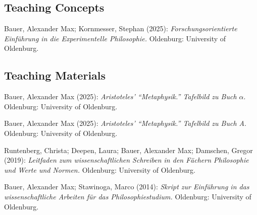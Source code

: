 \documentclass[a4paper,10pt]{article}
\newenvironment{literature}{%
   \parskip6pt\parindent0pt\raggedright
   \def\lititem{\hangindent=1cm\hangafter1}}{%
   \par\ignorespaces}
\begin{document}
\subsection*{Teaching Concepts}
\begin{literature}
\lititem Bauer, Alexander Max; Kornmesser, Stephan (2025): \textit{Forschungsorientierte Einführung in die Experimentelle Philosophie.} Oldenburg: University of Oldenburg.
\end{literature}


\subsection*{Teaching Materials}
\begin{literature}
\lititem Bauer, Alexander Max (2025): \textit{Aristoteles' \enquote{Metaphysik.} Tafelbild zu Buch $\alpha$}. Oldenburg: University of Oldenburg.

\lititem Bauer, Alexander Max (2025): \textit{Aristoteles' \enquote{Metaphysik.} Tafelbild zu Buch A}. Oldenburg: University of Oldenburg.

\lititem Runtenberg, Christa; Deepen, Laura; Bauer, Alexander Max; Damschen, Gregor (2019): \textit{Leitfaden zum wissenschaftlichen Schreiben in den Fächern Philosophie und Werte und Normen.} Oldenburg: University of Oldenburg.

\lititem Bauer, Alexander Max; Stawinoga, Marco (2014): \textit{Skript zur Einführung in das wissenschaftliche Arbeiten für das Philosophiestudium.} Oldenburg: University of Oldenburg.
\end{literature}


\end{document}
